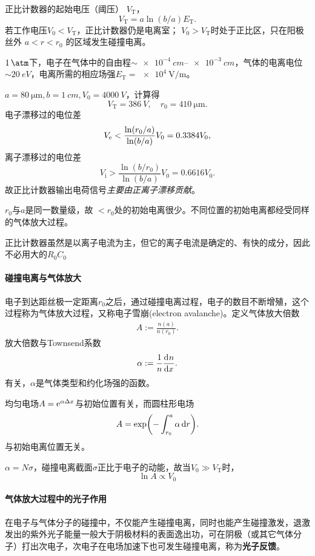 正比计数器的起始电压（阈压） $V_{\mathrm T}$，
\begin{equation}\label{eq:nrd-proportional-counter-threshold}
	V_{\mathrm T} = a\ln(b/a)E_{\mathrm T}.
\end{equation}
若工作电压$V_0 < V_\mathrm T$，正比计数器仍是电离室；
$V_0 > V_\mathrm T$时处于正比区，只在阳极丝外 $a < r < r_0$ 的区域发生碰撞电离。
\begin{example}{}{}
	$\qty{1}{\atm}$下，电子在气体中的自由程$\sim \qtyrange{e-4}{e-3}{cm}$，气体的电离电位$\sim \qty{20}{eV}$，电离所需的相应场强$E_\mathrm T = \qty{e4}{\volt\per\metre}$。

	$a = \qty{80}{\micro\metre},b = \qty{1}{cm},V_0 = \qty{4000}{V}$，计算得
	\[
		V_\mathrm T = \qty{386}{V},\quad r_0 = \qty{410}{\micro\metre}.
	\]
	电子漂移过的电位差
	\[
		V_{\mathrm{e}} < \frac{\ln(r_0/a)}{\ln(b/a)}V_0 = 0.3384V_0,
	\]
	离子漂移过的电位差
	\[
		V_{\mathrm i} > \frac{\ln(b/r_0)}{\ln(b/a)}V_0 = 0.6616V_0.
	\]
	故正比计数器输出电荷信号\textit{主要由正离子漂移贡献}。
\end{example}
$r_0$与$a$是同一数量级，故%
$< r_0$处的初始电离很少。不同位置的初始电离都经受同样的气体放大过程。%

正比计数器虽然是以离子电流为主，但它的离子电流是确定的、有快的成分，因此不必用大的$R_0C_0$
\paragraph{碰撞电离与气体放大}
电子到达距丝极一定距离$r_0$之后，通过碰撞电离过程，电子的数目不断增殖，这个过程称为气体放大过程，又称电子雪崩(electron avalanche)。定义气体放大倍数
\begin{align}
	A := \frac{n(a)}{n(r_0)}.
\end{align}
放大倍数与Townsend系数
\begin{equation}\label{eq:nrd-townsend-coefficient}
	\alpha := \frac1n\frac{\mathop{}\!\mathrm{d}^{}n}{\mathrm{d}{x}^{}}.
\end{equation}
有关，$\alpha$是气体类型和约化场强的函数。

均匀电场$A = \mathop{}\!\mathrm{e}^{\alpha\Delta x}$与初始位置有关，而圆柱形电场
\begin{equation}\label{eq:nrd-cylindrical-avalanche-gain}
	A = \exp\biggl(-\int_{r_0}^a\alpha\mathop{}\!\mathrm{d} r\biggr).
\end{equation}
与初始电离位置无关。

$\alpha = N\sigma$，碰撞电离截面$\sigma$正比于电子的动能，故当$V_0 \gg V_\mathrm T$时，
\[
	\ln A \propto V_0
\]
\paragraph{气体放大过程中的光子作用}
在电子与气体分子的碰撞中，不仅能产生碰撞电离，同时也能产生碰撞激发，退激发出的紫外光子能量一般大于阴极材料的表面逸出功，可在阴极（或其它气体分子）打出次电子，次电子在电场加速下也可发生碰撞电离，称为\textbf{光子反馈}。

